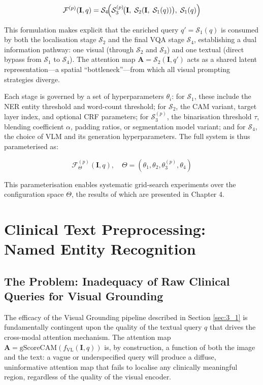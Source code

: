 \[
\mathcal{F}^{(p)}(\mathbf{I}, q) = \mathcal{S}_4\!\Bigl(\mathcal{S}_3^{(p)}\!\bigl(\mathbf{I},\; \mathcal{S}_2(\mathbf{I},\; \mathcal{S}_1(q))\bigr),\; \mathcal{S}_1(q)\Bigr)
\]

This formulation makes explicit that the enriched query $q' = \mathcal{S}_1(q)$ is consumed by both the localisation stage $\mathcal{S}_2$ and the final VQA stage $\mathcal{S}_4$, establishing a dual information pathway: one visual (through $\mathcal{S}_2$ and $\mathcal{S}_3$) and one textual (direct bypass from $\mathcal{S}_1$ to $\mathcal{S}_4$). The attention map $\mathbf{A} = \mathcal{S}_2(\mathbf{I}, q')$ acts as a shared latent representation---a spatial ``bottleneck''---from which all visual prompting strategies diverge.

Each stage is governed by a set of hyperparameters $\theta_i$: for $\mathcal{S}_1$, these include the NER entity threshold and word-count threshold; for $\mathcal{S}_2$, the CAM variant, target layer index, and optional CRF parameters; for $\mathcal{S}_3^{(p)}$, the binarisation threshold $\tau$, blending coefficient $\alpha$, padding ratios, or segmentation model variant; and for $\mathcal{S}_4$, the choice of VLM and its generation hyperparameters. The full system is thus parameterised as:

\[
\mathcal{F}^{(p)}_{\Theta}(\mathbf{I}, q), \quad \Theta = (\theta_1, \theta_2, \theta_3^{(p)}, \theta_4)
\]

This parameterisation enables systematic grid-search experiments over the configuration space $\Theta$, the results of which are presented in Chapter 4.

\section{Clinical Text Preprocessing: Named Entity Recognition}
\label{sec:3_2}

\subsection{The Problem: Inadequacy of Raw Clinical Queries for Visual Grounding}
\label{sec:3_2_1}

The efficacy of the Visual Grounding pipeline described in Section \ref{sec:3_1} is fundamentally contingent upon the quality of the textual query $q$ that drives the cross-modal attention mechanism. The attention map
$\mathbf{A} = \text{gScoreCAM}(f_{\text{VL}}(\mathbf{I}, q))$ is, by construction, a function of both the image and the text: a vague or underspecified query will produce a diffuse, uninformative attention map that fails to localise any clinically meaningful region, regardless of the quality of the visual encoder.

